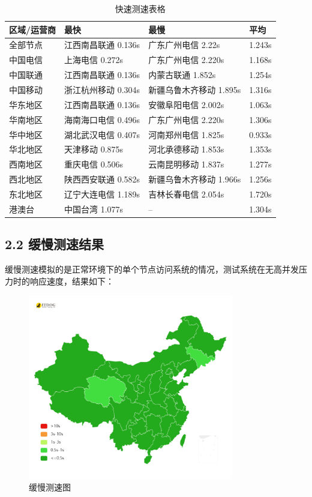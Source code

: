 \documentclass{article}
\begin{document}
\begin{table}[H]
    \centering
    \begin{tabular}{|l|l|l|l|}
        \hline
        \textbf{区域/运营商} & \textbf{最快} & \textbf{最慢} & \textbf{平均} \\ \hline
        全部节点 & 江西南昌联通 0.136s & 广东广州电信 2.22s & 1.243s \\ \hline
        中国电信 & 上海电信 0.272s & 广东广州电信 2.220s & 1.168s \\ \hline
        中国联通 & 江西南昌联通 0.136s & 内蒙古联通 1.852s & 1.254s \\ \hline
        中国移动 & 浙江杭州移动 0.304s & 新疆乌鲁木齐移动 1.895s & 1.316s \\ \hline
        华东地区 & 江西南昌联通 0.136s & 安徽阜阳电信 2.002s & 1.063s \\ \hline
        华南地区 & 海南海口电信 0.496s & 广东广州电信 2.220s & 1.306s \\ \hline
        华中地区 & 湖北武汉电信 0.407s & 河南郑州电信 1.825s & 0.933s \\ \hline
        华北地区 & 天津移动 0.875s & 河北承德移动 1.853s & 1.353s \\ \hline
        西南地区 & 重庆电信 0.506s & 云南昆明移动 1.837s & 1.277s \\ \hline
        西北地区 & 陕西西安联通 0.582s & 新疆乌鲁木齐移动 1.966s & 1.256s \\ \hline
        东北地区 & 辽宁大连电信 1.189s & 吉林长春电信 2.054s & 1.720s \\ \hline
        港澳台 & 中国台湾 1.077s & -- & 1.304s \\ \hline
    \end{tabular}
    \caption{快速测速表格}
\end{table}

\subsection*{2.2 缓慢测速结果}
缓慢测速模拟的是正常环境下的单个节点访问系统的情况，测试系统在无高并发压力时的响应速度，结果如下：

\begin{figure}[H]
    \centering
    \includegraphics[width=0.8\textwidth]{缓慢测速.png}
    \caption{缓慢测速图}
\end{figure}
\end{document}
